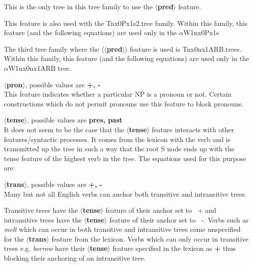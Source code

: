 This is the only tree in this tree family to use the 
{\bf $\langle$pred$\rangle$} feature.

This feature is also used with the Tnx0Px1s2.tree family. 
 Within this family, this feature (and the
following equations) are used only in the $\alpha$W1nx0Px1s



The third tree family where the {\bf $\langle$$\langle$pred$\rangle$$\rangle$} feature is
used is Tnx0nx1ARB.trees.  Within this family, this feature (and the
following equations) are used only in the $\alpha$W1nx0nx1ARB tree.



{\bf $\langle$pron$\rangle$}, possible values are {\bf +, -}\\
This feature indicates whether a particular NP is a pronoun or not. 
Certain constructions which do not permit pronouns use this 
feature to block pronouns.

{\bf $\langle$tense$\rangle$}, possible values are {\bf pres, past}\\
It does not seem to be the case that the {\bf $\langle$tense$\rangle$}
feature interacts with other features/syntactic processes. It 
comes from the lexicon with the verb and is transmitted up the
tree in such a way that the root S node ends up with the
tense feature of the highest verb in the tree. The equations
used for this purpose are:



{\bf $\langle$trans$\rangle$}, possible values are {\bf +, -}\\
Many but not all English verbs can anchor both transitive and intransitive trees.


Transitive trees have the {\bf $\langle$tense$\rangle$} feature of their
anchor set to {\ +} and intransitive trees have the 
{\bf $\langle$tense$\rangle$} feature of their
anchor set to {\ -}. Verbs such as {\em melt} which can occur 
in both transitive and intransitive trees come unspecified for the 
{\bf $\langle$trans$\rangle$} feature from the lexicon. Verbs which 
can only occur in transitive trees e.g. {\em borrow} have their
{\bf $\langle$tense$\rangle$} feature 
specified in the lexicon as {\bf +} thus blocking their anchoring of 
an intransitive tree.

